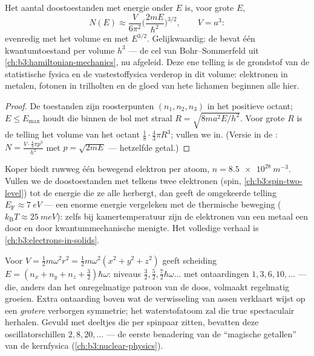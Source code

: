 \begin{proposition}\label{prop:b3:schrodinger-three-dimensions:counting}
Het aantal doostoestanden met energie onder $E$ is, voor grote $E$,
\[
N(E) \approx \frac{V}{6\pi^2}\Big(\frac{2mE}{\hbar^2}\Big)^{3/2} ,
\qquad V = a^3 :
\]
evenredig met het volume en met $E^{3/2}$. Gelijkwaardig: de 
bevat één kwantumtoestand per volume $h^3$ --- de cel van
Bohr--Sommerfeld uit \cref{ch:b3:hamiltonian-mechanics}, nu afgeleid.
Deze ene telling is de grondstof van de statistische fysica en de
vastestoffysica verderop in dit volume: elektronen in metalen, fotonen in
trilholten en de gloed van hete lichamen beginnen alle hier.
\end{proposition}

\begin{proof}
De toestanden zijn roosterpunten $(n_1, n_2, n_3)$ in het positieve
octant; $E \le E_{\max}$ houdt die binnen de bol met straal $R =
\sqrt{8ma^2E/h^2}$. Voor grote $R$ is de telling het volume van het octant
$\tfrac18\cdot\tfrac43\pi R^3$; vullen we in. (Versie in de :
$N = \tfrac{V\cdot\frac43\pi p^3}{h^3}$ met $p = \sqrt{2mE}$ --- hetzelfde
getal.)
\end{proof}

\begin{example}\label{ex:b3:schrodinger-three-dimensions:metal}
Koper biedt ruwweg één bewegend elektron per atoom, $n =
\qty{8.5e28}{m^{-3}}$. Vullen we de doostoestanden met telkens twee
elektronen (spin, \cref{ch:b3:spin-two-level}) tot de energie die ze alle
herbergt, dan geeft de omgekeerde telling $E_{\text{F}}
\approx \qty{7}{eV}$ --- een enorme energie vergeleken met de thermische
beweging ($k_{\text{B}}T \approx \qty{25}{meV}$): zelfs bij
kamertemperatuur zijn de elektronen van een metaal een door en door
kwantummechanische menigte. Het volledige verhaal is
\cref{ch:b3:electrons-in-solids}.
\end{example}

\begin{example}\label{ex:b3:schrodinger-three-dimensions:oscillator}
Voor $V = \tfrac12 m\omega^2r^2 = \tfrac12 m\omega^2(x^2 + y^2 +
z^2)$
geeft scheiding $E = (n_x + n_y + n_z + \tfrac32)\hbar\omega$: niveaus
$\tfrac32, \tfrac52, \tfrac72\hbar\omega\ldots$ met ontaardingen $1, 3, 6, 10, \dots$ --- die, anders dan het onregelmatige patroon van de doos,
volmaakt regelmatig groeien. Extra ontaarding boven wat de verwisseling
van assen verklaart wijst op een \emph{grotere} verborgen symmetrie; het
waterstofatoom zal die truc spectaculair herhalen. Gevuld met deeltjes
die per spinpaar zitten, bevatten deze oscillatorschillen $2,
8, 20, \dots$ --- de eerste benadering van de ``magische getallen'' van de
kernfysica (\cref{ch:b3:nuclear-physics}).
\end{example}


